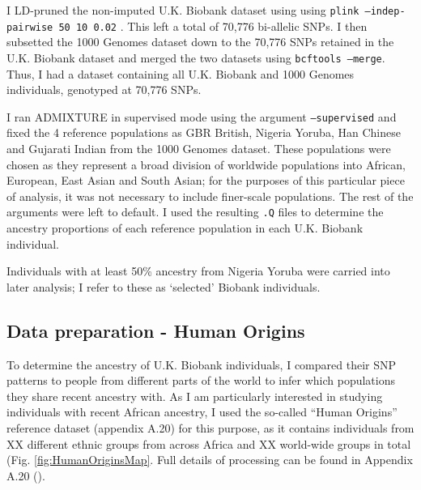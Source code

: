 I LD-pruned the non-imputed U.K. Biobank dataset using using \texttt{plink --indep-pairwise 50 10 0.02} \cite{purcell2007plink}. This left a total of 70,776 bi-allelic SNPs. I then subsetted the 1000 Genomes dataset down to the 70,776 SNPs retained in the U.K. Biobank dataset and merged the two datasets using \texttt{bcftools --merge}. Thus, I had a dataset containing all U.K. Biobank and 1000 Genomes individuals, genotyped at 70,776 SNPs.

I ran ADMIXTURE in supervised mode using the argument \texttt{--supervised} and fixed the 4 reference populations as GBR British, Nigeria Yoruba, Han Chinese and Gujarati Indian from the 1000 Genomes dataset. These populations were chosen as they represent a broad division of worldwide populations into African, European, East Asian and South Asian; for the purposes of this particular piece of analysis, it was not necessary to include finer-scale populations. The rest of the arguments were left to default. I used the resulting \texttt{.Q} files to determine the ancestry proportions of each reference population in each U.K. Biobank individual. 

Individuals with at least 50\% ancestry from Nigeria Yoruba were carried into later analysis; I refer to these as `selected' Biobank individuals.

\subsection{Data preparation - Human Origins}

To determine the ancestry of U.K. Biobank individuals, I compared their SNP patterns to people from different parts of the world to infer which populations they share recent ancestry with. As I am particularly interested in studying individuals with recent African ancestry, I used the so-called ``Human Origins'' reference dataset (appendix A.20) for this purpose, as it contains individuals from XX different ethnic groups from across Africa and XX world-wide groups in total (Fig. \ref{fig:HumanOriginsMap}. Full details of processing can be found in Appendix A.20 ().

